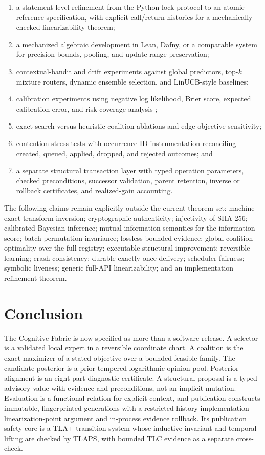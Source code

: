 \documentclass[11pt]{article}
\theoremstyle{definition}
\theoremstyle{plain}
\begin{document}
\begin{enumerate}[leftmargin=*,itemsep=2pt]
  \item a statement-level refinement from the Python lock protocol to an atomic
  reference specification, with explicit call/return histories for a
  mechanically checked linearizability theorem;
  \item a mechanized algebraic development in Lean, Dafny, or a comparable
  system for precision bounds, pooling, and update range preservation;
  \item contextual-bandit and drift experiments against global predictors,
  top-$k$ mixture routers, dynamic ensemble selection, and LinUCB-style
  baselines;
  \item calibration experiments using negative log likelihood, Brier score,
  expected calibration error, and risk-coverage analysis
  \cite{guo2017};
  \item exact-search versus heuristic coalition ablations and edge-objective
  sensitivity;
  \item contention stress tests with occurrence-ID instrumentation reconciling
  created, queued, applied, dropped, and rejected outcomes; and
  \item a separate structural transaction layer with typed operation
  parameters, checked preconditions, successor validation, parent retention,
  inverse or rollback certificates, and realized-gain accounting.
\end{enumerate}

The following claims remain explicitly outside the current theorem set:
machine-exact transform inversion; cryptographic authenticity; injectivity of
SHA-256; calibrated Bayesian inference; mutual-information semantics for the
information score; batch permutation invariance; lossless bounded evidence;
global coalition optimality over the full registry; executable structural
improvement; reversible learning; crash consistency; durable exactly-once
delivery; scheduler fairness; symbolic liveness; generic full-API
linearizability; and an implementation refinement theorem.

\section{Conclusion}

The Cognitive Fabric is now specified as more than a software release.  A
selector is a validated local expert in a reversible coordinate chart.  A
coalition is the exact maximizer of a stated objective over a bounded feasible
family.  The candidate posterior is a prior-tempered logarithmic opinion pool.
Posterior alignment is an eight-part diagnostic certificate.  A structural
proposal is a typed advisory value with evidence and preconditions, not an
implicit mutation.  Evaluation is a functional relation for explicit context,
and publication constructs immutable, fingerprinted generations with
a restricted-history implementation linearization-point argument and
in-process evidence rollback.  Its publication safety core is a TLA+
transition system whose inductive invariant and temporal lifting are checked by
TLAPS, with bounded TLC evidence as a separate cross-check.
\end{document}
